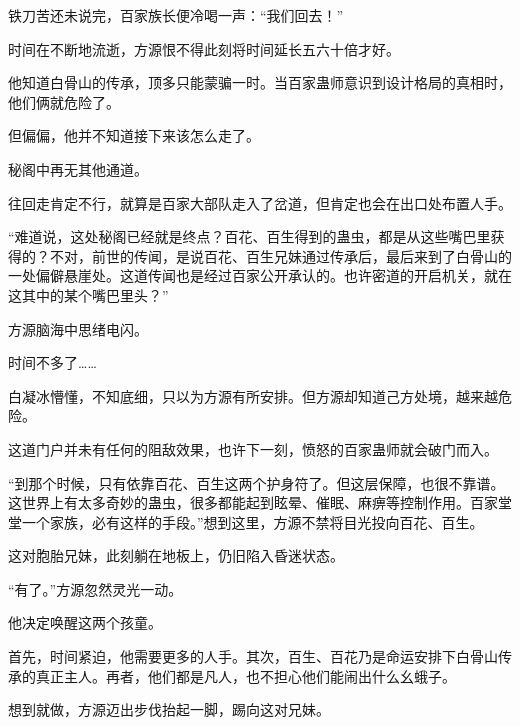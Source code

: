 \begin{this_body}
铁刀苦还未说完，百家族长便冷喝一声：“我们回去！”

时间在不断地流逝，方源恨不得此刻将时间延长五六十倍才好。

他知道白骨山的传承，顶多只能蒙骗一时。当百家蛊师意识到设计格局的真相时，他们俩就危险了。

但偏偏，他并不知道接下来该怎么走了。

秘阁中再无其他通道。

往回走肯定不行，就算是百家大部队走入了岔道，但肯定也会在出口处布置人手。

“难道说，这处秘阁已经就是终点？百花、百生得到的蛊虫，都是从这些嘴巴里获得的？不对，前世的传闻，是说百花、百生兄妹通过传承后，最后来到了白骨山的一处偏僻悬崖处。这道传闻也是经过百家公开承认的。也许密道的开启机关，就在这其中的某个嘴巴里头？”

方源脑海中思绪电闪。

时间不多了……

白凝冰懵懂，不知底细，只以为方源有所安排。但方源却知道己方处境，越来越危险。

这道门户并未有任何的阻敌效果，也许下一刻，愤怒的百家蛊师就会破门而入。

“到那个时候，只有依靠百花、百生这两个护身符了。但这层保障，也很不靠谱。这世界上有太多奇妙的蛊虫，很多都能起到眩晕、催眠、麻痹等控制作用。百家堂堂一个家族，必有这样的手段。”想到这里，方源不禁将目光投向百花、百生。

这对胞胎兄妹，此刻躺在地板上，仍旧陷入昏迷状态。

“有了。”方源忽然灵光一动。

他决定唤醒这两个孩童。

首先，时间紧迫，他需要更多的人手。其次，百生、百花乃是命运安排下白骨山传承的真正主人。再者，他们都是凡人，也不担心他们能闹出什么幺蛾子。

想到就做，方源迈出步伐抬起一脚，踢向这对兄妹。

\end{this_body}

